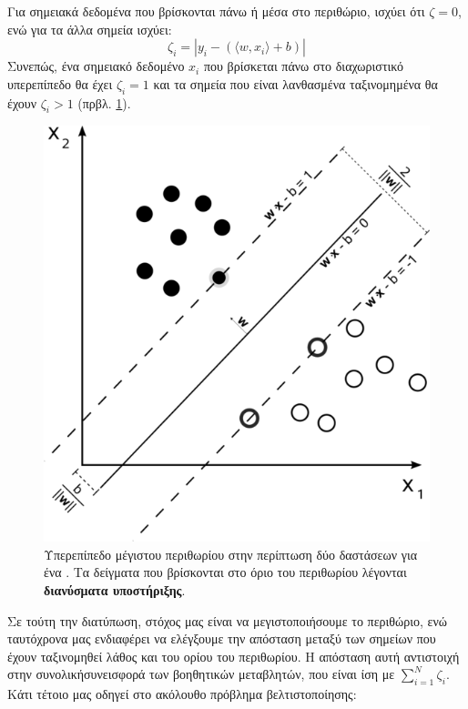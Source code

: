 Για σημειακά δεδομένα που βρίσκονται πάνω ή μέσα στο περιθώριο, ισχύει ότι $\zeta = 0$, ενώ για τα άλλα σημεία ισχύει:
\begin{equation}
\zeta_{i} = | y_{i} - (\langle w, x_{i} \rangle + b )|    
\end{equation}
Συνεπώς, ένα σημειακό δεδομένο $x_{i}$ που βρίσκεται πάνω στο διαχωριστικό υπερεπίπεδο θα έχει $\zeta_{i} = 1$ και τα σημεία που είναι λανθασμένα ταξινομημένα θα έχουν $\zeta_{i} > 1$ (πρβλ. \ref{fig:svm_sep}).
\begin{figure}
    \centering
    \includegraphics[scale=0.6]{figures/556px-Svm_max_sep_hyperplane_with_margin.png}
    \caption{Υπερεπίπεδο μέγιστου περιθωρίου στην περίπτωση δύο δαστάσεων για ένα . Τα δείγματα που βρίσκονται στο όριο του περιθωρίου λέγονται \textbf{διανύσματα υποστήριξης}.}
    \label{fig:svm_sep}
\end{figure}
Σε τούτη την διατύπωση, στόχος μας είναι να μεγιστοποιήσουμε το περιθώριο, ενώ ταυτόχρονα μας ενδιαφέρει να ελέγξουμε την απόσταση μεταξύ των σημείων που έχουν ταξινομηθεί λάθος και του ορίου του περιθωρίου.
Η απόσταση αυτή αντιστοιχή στην συνολικήσυνεισφορά των βοηθητικών μεταβλητών, που είναι ίση με $\sum_{i=1}^{N} \zeta_{i}$.
Κάτι τέτοιο μας οδηγεί στο ακόλουθο πρόβλημα βελτιστοποίησης:

